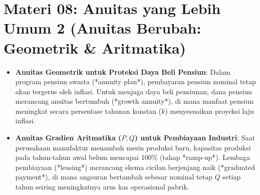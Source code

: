 \documentclass[11pt,a4paper]{article}
\begin{document}
\newpage

\section*{Materi 08: Anuitas yang Lebih Umum 2 (Anuitas Berubah: Geometrik \& Aritmatika)}

\begin{kasusbox}
\begin{itemize}[leftmargin=4mm, topsep=1pt, itemsep=1pt]
    \item \textbf{Anuitas Geometrik untuk Proteksi Daya Beli Pensiun}: Dalam program pensiun swasta (*annuity plan*), pembayaran pensiun nominal tetap akan tergerus oleh inflasi. Untuk menjaga daya beli pensiunan, dana pensiun merancang anuitas bertumbuh (*growth annuity*), di mana manfaat pensiun meningkat secara persentase tahunan konstan ($k$) menyesuaikan proyeksi laju inflasi.
    \item \textbf{Anuitas Gradien Aritmatika ($P, Q$) untuk Pembiayaan Industri}: Saat perusahaan manufaktur menambah mesin produksi baru, kapasitas produksi pada tahun-tahun awal belum mencapai 100\% (tahap *ramp-up*). Lembaga pembiayaan (*leasing*) merancang skema cicilan berjenjang naik (*graduated payment*), di mana angsuran bertambah sebesar nominal tetap $Q$ setiap tahun seiring meningkatnya arus kas operasional pabrik.
\end{itemize}
\end{kasusbox}
\end{document}
